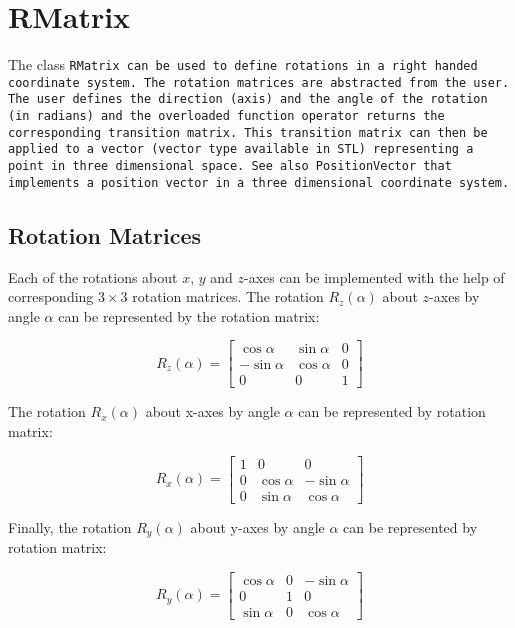 \section{RMatrix}

The class \tt RMatrix \rm can be used to define rotations in
a right handed coordinate system. The rotation  matrices
are abstracted from the user. The user defines the direction
(axis) and the angle of the rotation (in radians) and the 
overloaded function operator returns the corresponding 
transition matrix. This transition matrix can then be applied 
to a vector (\tt vector \rm type available in STL) representing a point
in three dimensional space. See also \tt PositionVector \rm
that implements a position vector in a three dimensional coordinate 
system.

\subsection{Rotation Matrices}\label{ssc:rm}

Each of the rotations about $x$, $y$ and $z$-axes can be implemented with
the help of corresponding $3 \times 3$ rotation matrices. 
The rotation $R_{z}(\alpha)$ about $z$-axes by angle 
$\alpha$ can be represented 
by the rotation matrix:

\begin{displaymath}
R_{z}(\alpha) =
\left[ 
\begin{array}{ccc}
\cos\alpha & \sin\alpha & 0 \\
-\sin\alpha & \cos\alpha & 0 \\
0 & 0 & 1 
\end{array}
\right]
\end{displaymath}  
 
The rotation $R_{x}(\alpha)$  about x-axes by angle $\alpha$ 
can be represented by rotation matrix:

\begin{displaymath}
R_{x}(\alpha) =
\left[ 
\begin{array}{ccc}
1 & 0 & 0 \\
0 & \cos\alpha & -\sin\alpha  \\
0 &\sin\alpha  &  \cos\alpha
\end{array}
\right]
\end{displaymath}  

Finally, the rotation $R_{y}(\alpha)$  about y-axes by angle $\alpha$
can be represented by rotation matrix:

\begin{displaymath}
R_{y}(\alpha) =
\left[ 
\begin{array}{ccc}
\cos\alpha & 0 & -\sin\alpha \\
0 & 1 & 0 \\
\sin\alpha & 0 & \cos\alpha
\end{array}
\right]
\end{displaymath}  

